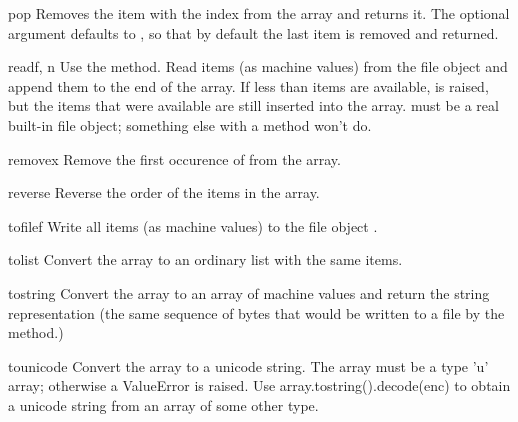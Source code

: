 \begin{methoddesc}[array]{pop}{}
Removes the item with the index  from the array and returns
it. The optional argument defaults to , so that by default
the last item is removed and returned.
\end{methoddesc}

\begin{methoddesc}[array]{read}{f, n}
  {Use the  method.}
Read  items (as machine values) from the file object 
and append them to the end of the array.  If less than  items
are available,  is raised, but the items that were
available are still inserted into the array.   must be a real
built-in file object; something else with a  method won't
do.
\end{methoddesc}

\begin{methoddesc}[array]{remove}{x}
Remove the first occurence of  from the array.
\end{methoddesc}

\begin{methoddesc}[array]{reverse}{}
Reverse the order of the items in the array.
\end{methoddesc}

\begin{methoddesc}[array]{tofile}{f}
Write all items (as machine values) to the file object .
\end{methoddesc}

\begin{methoddesc}[array]{tolist}{}
Convert the array to an ordinary list with the same items.
\end{methoddesc}

\begin{methoddesc}[array]{tostring}{}
Convert the array to an array of machine values and return the
string representation (the same sequence of bytes that would
be written to a file by the  method.)
\end{methoddesc}

\begin{methoddesc}[array]{tounicode}{}
Convert the array to a unicode string.  The array must be
a type 'u' array; otherwise a ValueError is raised.  Use
array.tostring().decode(enc) to obtain a unicode string
from an array of some other type.
\end{methoddesc}

